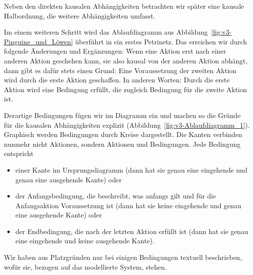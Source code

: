 Neben den direkten kausalen Abhängigkeiten betrachten wir später eine kausale Halbordnung, die weitere Abhängigkeiten umfasst. 



Im einem weiteren Schritt wird das Ablaufdiagramm aus Abbildung~\ref{fig:v3-Pinguine_und_Löwen} überführt in ein erstes Petrinetz. Das erreichen wir durch folgende Änderungen und Ergänzungen: Wenn eine Aktion erst nach einer anderen Aktion geschehen kann, sie also kausal von der anderen Aktion abhängt, dann gibt es dafür stets einen Grund: Eine Voraussetzung der zweiten Aktion wird durch die erste Aktion geschaffen. In anderen Worten: Durch die erste Aktion wird eine Bedingung erfüllt, die zugleich Bedingung für die zweite Aktion ist.

Derartige Bedingungen fügen wir im Diagramm ein 
und machen so die Gründe für die kausalen Abhängigkeiten explizit (Abbildung~\ref{fig:v3-Ablaufdiagramm_1}). Graphisch werden Bedingungen durch Kreise dargestellt. Die Kanten verbinden nunmehr nicht Aktionen, sondern Aktionen und Bedingungen. Jede Bedingung entspricht
\begin{itemize}
	\item einer Kante im Ursprungsdiagramm (dann hat sie genau eine eingehende und genau eine ausgehende Kante) oder
	\item der Anfangsbedingung, die beschreibt, was anfangs gilt und für die Anfangs\-aktion Voraussetzung ist (dann hat sie keine eingehende und genau eine ausgehende Kante) oder
	\item der Endbedingung, die nach der letzten Aktion erfüllt ist (dann hat sie genau eine eingehende und keine ausgehende Kante).
\end{itemize}

Wir haben aus Platzgründen nur bei einigen Bedingungen textuell beschrieben, wofür sie, bezogen auf das modellierte System, stehen.


